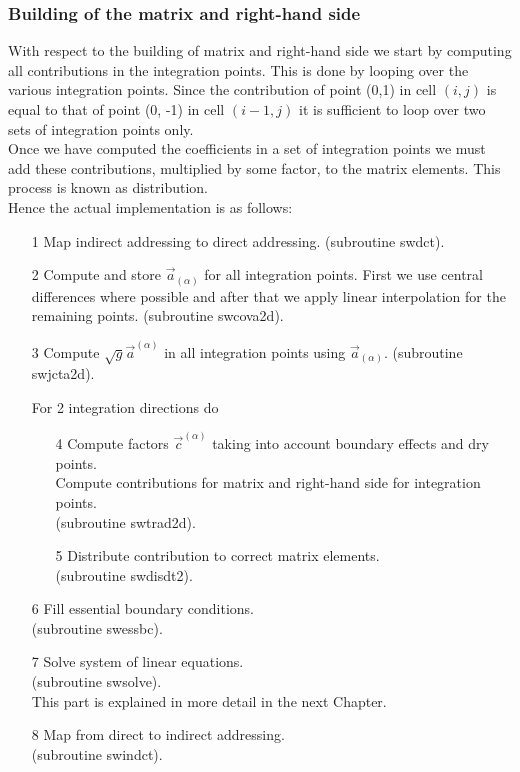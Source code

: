 \documentclass[12pt]{book}
\begin{document}
\subsubsection{Building of the matrix and right-hand side}
\label{subsec1.5G}
%
With respect to the building of matrix and right-hand side we start by
computing all contributions in the integration points. This is done by
looping over the various integration points. Since the contribution of
point (0,1) in cell $(i, j)$ is equal to that of point (0, -1) in cell
$(i-1,j)$ it is sufficient to loop over two sets of integration points
only.\\[2ex]
Once we have computed the coefficients in a set of integration points we
must add these contributions, multiplied by some factor, to the matrix
elements. This process is known as distribution.\\[2ex]
Hence the actual implementation is as follows:
\begin{itemize}
\item[1] Map indirect addressing to direct addressing. (subroutine swdct).
\item[2] Compute and store $\vec{a}_{(\alpha)}$ for all integration points.
First we use central differences where possible and after that we apply
linear interpolation for the remaining points. (subroutine swcova2d).
\item[3] Compute $\sqrt{g}\vec{a}^{(\alpha)}$ in all integration points using
$\vec{a}_{(\alpha)}$. (subroutine swjcta2d).
\item[ ] For 2 integration directions do
 \begin{itemize}
 \item[4] Compute factors $\vec{c}^{(\alpha)}$ taking into account boundary
 effects and dry points.\\
 Compute contributions for matrix and right-hand side for integration
 points.\\
 (subroutine swtrad2d).
 \item[5] Distribute contribution to correct matrix elements.\\
 (subroutine swdisdt2).
 \end{itemize}
\item[6] Fill essential boundary conditions.\\
(subroutine swessbc).
\item[7] Solve system of linear equations.\\
(subroutine swsolve).\\
This part is explained in more detail in the next Chapter.
\item[8] Map from direct to indirect addressing.\\
(subroutine swindct).
\end{itemize}
\end{document}
